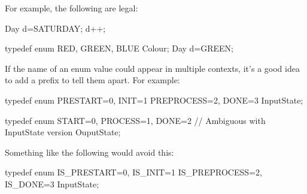 For example, the following are legal:
\begin{codeinline}
Day d=SATURDAY;
d++;

typedef enum {
    RED,
    GREEN,
    BLUE
} Colour;
Day d=GREEN;
\end{codeinline}

If the name of an enum value could appear in multiple contexts, it's a good idea to add a prefix to tell them apart.
For example:
\begin{codeinline}
typedef enum {
    PRESTART=0,
    INIT=1
    PREPROCESS=2,
    DONE=3
} InputState;

typedef enum {
    START=0,
    PROCESS=1,
    DONE=2      // Ambiguous with InputState version
} OuputState;
\end{codeinline}

Something like the following would avoid this:
\begin{codeinline}
typedef enum {
    IS_PRESTART=0,
    IS_INIT=1
    IS_PREPROCESS=2,
    IS_DONE=3
} InputState;
\end{codeinline}



